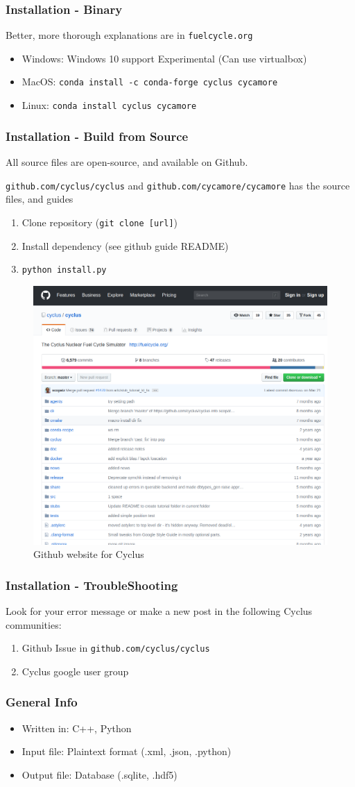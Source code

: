\begin{frame}
	\frametitle{Installation - Binary}
	Better, more thorough explanations are in \texttt{fuelcycle.org}
	\begin{itemize}
		\item Windows: Windows 10 support Experimental (Can use virtualbox) 
		\item MacOS: \texttt{conda install -c conda-forge cyclus cycamore}
		\item Linux: \texttt{conda install cyclus cycamore}
	\end{itemize}
\end{frame}


\begin{frame}
	\frametitle{Installation - Build from Source}
    All source files are open-source, and available on Github.

	\texttt{github.com/cyclus/cyclus} and \texttt{github.com/cycamore/cycamore} has the source files, and guides
	\begin{enumerate}
		\item Clone repository (\texttt{git clone [url]})
		\item Install dependency (see github guide README)
		\item \texttt{python install.py}
	\end{enumerate}

	\begin{figure}[htbp!]
        \begin{center}
                \includegraphics[width=.6\textwidth]{./images/github.png}
        \end{center}
        \caption{Github website for Cyclus}
	\end{figure}
\end{frame}


\begin{frame}
	\frametitle{Installation - TroubleShooting}
	Look for your error message or make a new post in the following Cyclus communities:
	\begin{enumerate}
		\item Github Issue in \texttt{github.com/cyclus/cyclus}
		\item Cyclus google user group
	\end{enumerate}
\end{frame}

\begin{frame}
	\frametitle{General Info}
	\begin{itemize}
		\item Written in: C++, Python
		\item Input file: Plaintext format (.xml, .json, .python)
		\item Output file: Database (.sqlite, .hdf5)
	\end{itemize}
\end{frame}

